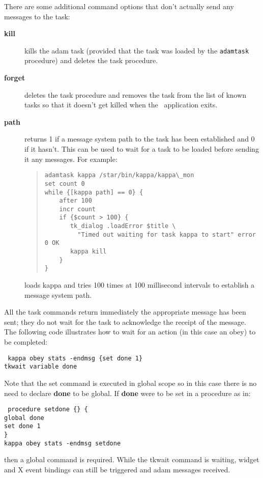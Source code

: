 There are some additional command options that don't actually send any messages
to the task:

\begin{description}
\item [{\bf kill}] kills the adam task (provided that the task was loaded
by the {\tt adamtask} procedure) and deletes the task procedure.
\item [{\bf forget}] deletes the task procedure and removes the task from
the list of known tasks so that it doesn't get killed when the \Tcl\ application
exits.
\item [{\bf path}]  returns 1
if a message system path to the task has been established and 0 if it hasn't. 
This can be used to wait for a task to be loaded before sending it any 
messages. For example:

\begin{quote}
\begin{verbatim}
adamtask kappa /star/bin/kappa/kappa\_mon
set count 0
while {[kappa path] == 0} {
    after 100
    incr count
    if {$count > 100} {
       tk_dialog .loadError $title \
         "Timed out waiting for task kappa to start" error 0 OK
       kappa kill
    }
}
\end{verbatim}
\end{quote}

loads kappa and tries 100 times at 100 millisecond intervals to establish 
a message system path.
\end{description}

All the task commands return immediately the appropriate message has been 
sent; they do not wait for the task to acknowledge the receipt of the 
message. The following code illustrates how to wait for an action (in 
this case an obey) to be completed:
\begin{tquote}{\tt
kappa obey stats -endmsg \{set done 1\}\\
tkwait variable done
}\end{tquote}
Note that the set command is executed in global scope so in this case there 
is no need to declare {\bf done} to be global. If {\bf done} were to be 
set in a procedure as in:
\begin{tquote}{\tt
procedure setdone \{\} \{\\
\hspace*{2em}global done\\
\hspace*{2em}set done 1\\
\}\\
kappa obey stats -endmsg setdone
}\end{tquote}
then a global command is required. While the tkwait command is waiting, 
widget and X event bindings can still be triggered and adam messages 
received.

